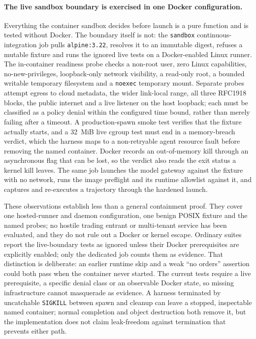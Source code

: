 \paragraph{The live sandbox boundary is exercised in one Docker configuration.} Everything the container sandbox decides before launch is a pure function and is tested without Docker. The boundary itself is not: the \texttt{sandbox} continuous-integration job pulls \texttt{alpine:3.22}, resolves it to an immutable digest, refuses a mutable fixture and runs the ignored live tests on a Docker-enabled Linux runner. The in-container readiness probe checks a non-root user, zero Linux capabilities, no-new-privileges, loopback-only network visibility, a read-only root, a bounded writable temporary filesystem and a \texttt{noexec} temporary mount. Separate probes attempt egress to cloud metadata, the wider link-local range, all three RFC1918 blocks, the public internet and a live listener on the host loopback; each must be classified as a policy denial within the configured time bound, rather than merely failing after a timeout. A production-spawn smoke test verifies that the fixture actually starts, and a 32~MiB live cgroup test must end in a memory-breach verdict, which the harness maps to a non-retryable agent resource fault before removing the named container. Docker records an out-of-memory kill through an asynchronous flag that can be lost, so the verdict also reads the exit status a kernel kill leaves. The same job launches the model gateway against the fixture with no network, runs the image preflight and its runtime allowlist against it, and captures and re-executes a trajectory through the hardened launch.

These observations establish less than a general containment proof. They cover one hosted-runner and daemon configuration, one benign POSIX fixture and the named probes; no hostile trading entrant or multi-tenant service has been evaluated, and they do not rule out a Docker or kernel escape. Ordinary suites report the live-boundary tests as ignored unless their Docker prerequisites are explicitly enabled; only the dedicated job counts them as evidence. That distinction is deliberate: an earlier runtime skip and a weak ``no orders'' assertion could both pass when the container never started. The current tests require a live prerequisite, a specific denial class or an observable Docker state, so missing infrastructure cannot masquerade as evidence. A harness terminated by uncatchable \texttt{SIGKILL} between spawn and cleanup can leave a stopped, inspectable named container; normal completion and object destruction both remove it, but the implementation does not claim leak-freedom against termination that prevents either path.

